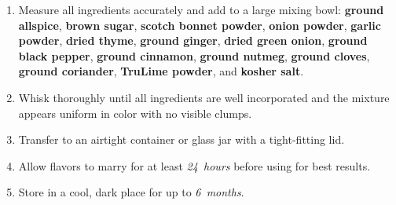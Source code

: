 \documentclass[11pt,letterpaper]{article}
\begin{document}
\begin{enumerate}
    \item Measure all ingredients accurately and add to a large mixing bowl: \textbf{ground allspice}, \textbf{brown sugar}, \textbf{scotch bonnet powder}, \textbf{onion powder}, \textbf{garlic powder}, \textbf{dried thyme}, \textbf{ground ginger}, \textbf{dried green onion}, \textbf{ground black pepper}, \textbf{ground cinnamon}, \textbf{ground nutmeg}, \textbf{ground cloves}, \textbf{ground coriander}, \textbf{TruLime powder}, and \textbf{kosher salt}.
    
    \item Whisk thoroughly until all ingredients are well incorporated and the mixture appears uniform in color with no visible clumps.
    
    \item Transfer to an airtight container or glass jar with a tight-fitting lid.
    
    \item Allow flavors to marry for at least \textit{24~hours} before using for best results.
    
    \item Store in a cool, dark place for up to \textit{6~months}.
\end{enumerate}
\end{document}
